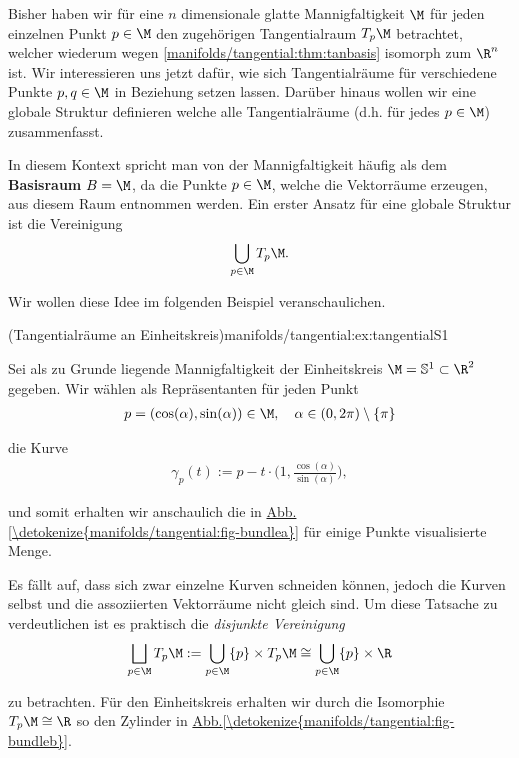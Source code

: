 \documentclass[letterpaper,10pt,german]{jupyterBook}
\begin{document}
\par
Bisher haben wir für eine \(n\) dimensionale glatte Mannigfaltigkeit \(\M\) für jeden einzelnen Punkt \(p\in\M\) den zugehörigen Tangentialraum \(T_p\M\) betrachtet, welcher wiederum wegen \cref{manifolds/tangential:thm:tanbasis} isomorph zum \(\R^n\) ist.
Wir interessieren uns jetzt dafür, wie sich Tangentialräume für verschiedene Punkte \(p,q\in \M\) in Beziehung setzen lassen.
Darüber hinaus wollen wir eine globale Struktur definieren welche alle Tangentialräume (d.h. für jedes \(p\in\M\)) zusammenfasst.

\par
In diesem Kontext spricht man von der Mannigfaltigkeit häufig als dem \textbf{Basisraum} \(B=\M\), da die Punkte \(p \in \M\), welche die Vektorräume erzeugen, aus diesem Raum entnommen werden.
Ein erster Ansatz für eine globale Struktur ist die Vereinigung
\begin{align*}
\bigcup_{p\in\M} T_p\M.
\end{align*}
\par
Wir wollen diese Idee im folgenden Beispiel veranschaulichen.
\begin{example}{(Tangentialräume an Einheitskreis)}{manifolds/tangential:ex:tangentialS1}



\par
Sei als zu Grunde liegende Mannigfaltigkeit der Einheitskreis \(\M = \mathbb{S}^1\subset\R^2\) gegeben.
Wir wählen als Repräsentanten für jeden Punkt
\begin{align*}
p=(\cos(\alpha), \sin(\alpha))\in\M, \quad \alpha\in (0,2\pi) \setminus \{\pi\}
\end{align*}
\par
die Kurve
\begin{align*}
\gamma_p(t) := p - t \cdot\big(1, \frac{\cos(\alpha)}{\sin(\alpha)}\big),
\end{align*}
\par
und somit erhalten wir anschaulich die in \hyperref[\detokenize{manifolds/tangential:fig-bundlea}]{Abb.\@ \ref{\detokenize{manifolds/tangential:fig-bundlea}}} für einige Punkte visualisierte Menge.

\par
Es fällt auf, dass sich zwar einzelne Kurven schneiden können, jedoch die Kurven selbst und die assoziierten Vektorräume nicht gleich sind.
Um diese Tatsache zu verdeutlichen ist es praktisch die \emph{disjunkte Vereinigung}
\begin{align*}
\bigsqcup_{p\in\M} T_p\M := \bigcup_{p\in\M} \{p\} \times T_p\M \cong \bigcup_{p\in\M} \{p\} \times \R
\end{align*}
\par
zu betrachten.
Für den Einheitskreis erhalten wir durch die Isomorphie \(T_p\M \cong \R\) so den Zylinder in \hyperref[\detokenize{manifolds/tangential:fig-bundleb}]{Abb.\@ \ref{\detokenize{manifolds/tangential:fig-bundleb}}}.
\end{example}
\end{document}
